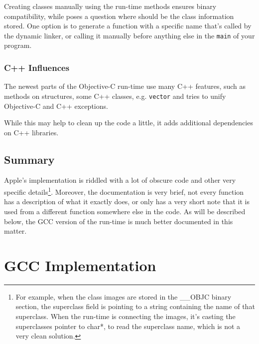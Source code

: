 \documentclass[a4paper, 11pt, fleqn]{book}
\begin{document}
Creating classes manually using the run-time methods ensures binary compatibility, while poses a question where should be the class information stored. One option is to generate a function with a specific name that's called by the dynamic linker, or calling it manually before anything else in the \verb=main= of your program.

\subsection{C++ Influences}
The newest parts of the Objective-C run-time use many C++ features, such as methods on structures, some C++ classes, e.g. \verb=vector= and tries to unify Objective-C and C++ exceptions.

While this may help to clean up the code a little, it adds additional dependencies on C++ libraries.


\section{Summary}
Apple's implementation is riddled with a lot of obscure code and other very specific details\footnote{For example, when the class images are stored in the \_\_OBJC binary section, the superclass field is pointing to a string containing the name of that superclass. When the run-time is connecting the images, it's casting the superclasses pointer to char*, to read the superclass name, which is not a very clean solution.}. Moreover, the documentation is very brief, not every function has a description of what it exactly does, or only has a very short note that it is used from a different function somewhere else in the code. As will be described below, the GCC version of the run-time is much better documented in this matter.

\chapter{GCC Implementation}
\end{document}
